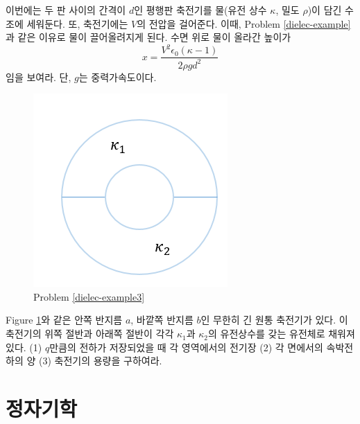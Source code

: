 \begin{problem}
이번에는 두 판 사이의 간격이 $d$인 평행판 축전기를 물(유전 상수 $\kappa$, 밀도 $\rho$)이 담긴 수조에 세워둔다. 또, 축전기에는 $V$의 전압을 걸어준다. 이때, Problem \ref{dielec-example}과 같은 이유로 물이 끌어올려지게 된다. 수면 위로 물이 올라간 높이가
\begin{equation}
x =\frac{V^2\epsilon_0(\kappa-1)}{2\rho g d^2}
\end{equation}
임을 보여라. 단, $g$는 중력가속도이다.
\end{problem}

\begin{problem}\label{dielec-example3}
\begin{figure}[h]
\centering\includegraphics[scale=0.5]{Pictures/dielectric3.PNG}
\caption{Problem \ref{dielec-example3}}
\label{fig:dielec-example3} %
\end{figure}
Figure \ref{fig:dielec-example3}와 같은 안쪽 반지름 $a$, 바깥쪽 반지름 $b$인 무한히 긴 원통 축전기가 있다. 이 축전기의 위쪽 절반과 아래쪽 절반이 각각 $\kappa_1$과 $\kappa_2$의 유전상수를 갖는 유전체로 채워져 있다. (1) $q$만큼의 전하가 저장되었을 때 각 영역에서의 전기장 (2) 각 면에서의 속박전하의 양 (3) 축전기의 용량을 구하여라.
\end{problem}

\chapter{정자기학}
